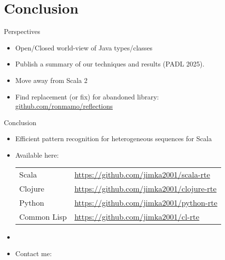 \section{Conclusion}


\begin{frame}{Perspectives}
  \begin{itemize}
  \item Open/Closed world-view of Java types/classes
  \item Publish a summary of our techniques and results (PADL 2025).
  \item Move away from Scala 2
  \item Find replacement (or fix) for abandoned library:   \url{github.com/ronmamo/reflections}
  \end{itemize}
\end{frame}

{
\begin{frame}{Conclusion}
  \begin{itemize}
  \item Efficient pattern recognition for heterogeneous sequences for Scala
  \item Available here:

    \bigskip
    
    \begin{tabular}{ll}
    Scala & \url{https://github.com/jimka2001/scala-rte}\\
    Clojure & \url{https://github.com/jimka2001/clojure-rte}\\
    Python & \url{https://github.com/jimka2001/python-rte}\\
    Common Lisp & \url{https://github.com/jimka2001/cl-rte}    
  \end{tabular}


    \bigskip
    
  \item {}

    \bigskip

  \item Contact me: 

  \end{itemize}
\end{frame}

}
